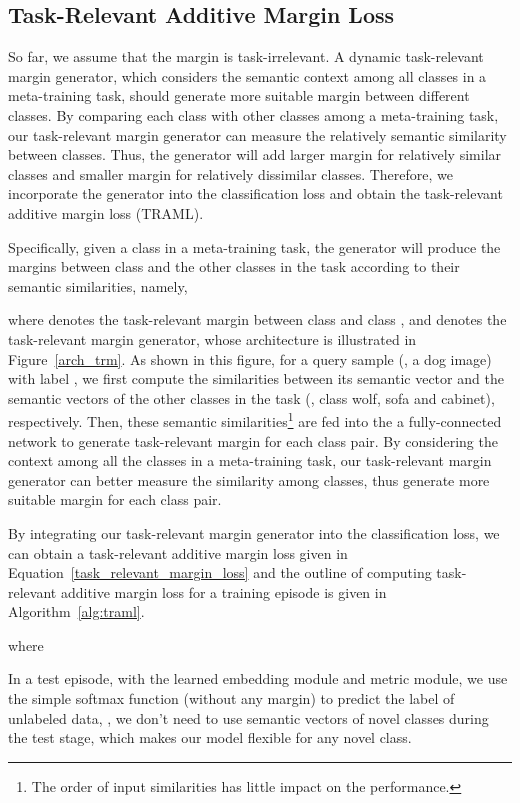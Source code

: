 \documentclass[10pt,twocolumn,letterpaper]{article}
\begin{document}
\subsection{Task-Relevant Additive Margin Loss}
\label{sect:task_relevant}

So far, we assume that the margin is task-irrelevant. A dynamic task-relevant margin generator, which considers the semantic context among all classes in a meta-training task, should generate more suitable margin between different classes. By comparing each class with other classes among a meta-training task, our task-relevant margin generator can measure the relatively semantic similarity between classes. Thus, the generator will add larger margin for relatively similar classes and smaller margin for relatively dissimilar classes. Therefore, we incorporate the generator into the classification loss and obtain the task-relevant additive margin loss (TRAML).

Specifically, given a class  in a meta-training task, the generator will produce the margins between class  and the other classes  in the task according to their semantic similarities, namely,

where  denotes the task-relevant margin between class  and class , and  denotes the task-relevant margin generator, whose architecture is illustrated in Figure~\ref{arch_trm}. As shown in this figure, for a query sample (\eg, a dog image) with label , we first compute the similarities between its semantic vector  and the semantic vectors of the other classes in the task (\eg, class wolf, sofa and cabinet), respectively. Then, these  semantic similarities\footnote{The order of input similarities has little impact on the performance.} are fed into the a fully-connected network to generate task-relevant margin for each class pair. By considering the context among all the classes in a meta-training task, our task-relevant margin generator can better measure the similarity among classes, thus generate more suitable margin for each class pair.

By integrating our task-relevant margin generator into the classification loss, we can obtain a task-relevant additive margin loss given in Equation~\ref{task_relevant_margin_loss} and the outline of computing task-relevant additive margin loss for a training episode is given in Algorithm~\ref{alg:traml}.

where 


In a test episode, with the learned embedding module and metric module, we use the simple softmax function (without any margin) to predict the label of unlabeled data, \ie, we don't need to use semantic vectors of novel classes during the test stage, which makes our model flexible for any novel class.
\end{document}
